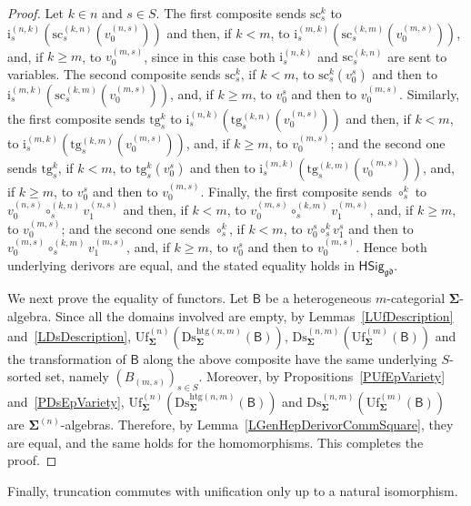 \documentclass[a4paper, reqno]{amsbook}
\newcommand{\sig}[1]{\mathbf{#1}}             %
\newcommand{\calg}[1]{\boldsymbol{\mathsf{#1}}} %
\newcommand{\gd}{\mathfrak{gd}}              %
\newcommand{\htg}{\mathrm{htg}}                %
\newcommand{\src}{\mathrm{sc}}
\newcommand{\tgt}{\mathrm{tg}}
\newcommand{\Uf}{\mathrm{Uf}}
\newcommand{\Ds}{\mathrm{Ds}}
\theoremstyle{plain}
\theoremstyle{definition}
\begin{document}
\begin{proof}
Let $k\in n$ and $s\in S$.
The first composite sends $\src^{k}_{s}$ to $\mathrm{i}^{(n,k)}_{s}(\src^{(k,n)}_{s}(v^{(n,s)}_{0}))$ and then, if $k<m$, to $\mathrm{i}^{(m,k)}_{s}(\src^{(k,m)}_{s}(v^{(m,s)}_{0}))$, and, if $k\geq m$, to $v^{(m,s)}_{0}$, since in this case both $\mathrm{i}^{(n,k)}_{s}$ and $\src^{(k,n)}_{s}$ are sent to variables.
The second composite sends $\src^{k}_{s}$, if $k<m$, to $\src^{k}_{s}(v^{s}_{0})$ and then to $\mathrm{i}^{(m,k)}_{s}(\src^{(k,m)}_{s}(v^{(m,s)}_{0}))$, and, if $k\geq m$, to $v^{s}_{0}$ and then to $v^{(m,s)}_{0}$.
Similarly, the first composite sends $\tgt^{k}_{s}$ to $\mathrm{i}^{(n,k)}_{s}(\tgt^{(k,n)}_{s}(v^{(n,s)}_{0}))$ and then, if $k<m$, to $\mathrm{i}^{(m,k)}_{s}(\tgt^{(k,m)}_{s}(v^{(m,s)}_{0}))$, and, if $k\geq m$, to $v^{(m,s)}_{0}$; and the second one sends $\tgt^{k}_{s}$, if $k<m$, to $\tgt^{k}_{s}(v^{s}_{0})$ and then to $\mathrm{i}^{(m,k)}_{s}(\tgt^{(k,m)}_{s}(v^{(m,s)}_{0}))$, and, if $k\geq m$, to $v^{s}_{0}$ and then to $v^{(m,s)}_{0}$.
Finally, the first composite sends $\circ^{k}_{s}$ to $v^{(n,s)}_{0}\circ^{(k,n)}_{s}v^{(n,s)}_{1}$ and then, if $k<m$, to $v^{(m,s)}_{0}\circ^{(k,m)}_{s}v^{(m,s)}_{1}$, and, if $k\geq m$, to $v^{(m,s)}_{0}$; and the second one sends $\circ^{k}_{s}$, if $k<m$, to $v^{s}_{0}\circ^{k}_{s}v^{s}_{1}$ and then to $v^{(m,s)}_{0}\circ^{(k,m)}_{s}v^{(m,s)}_{1}$, and, if $k\geq m$, to $v^{s}_{0}$ and then to $v^{(m,s)}_{0}$.
Hence both underlying derivors are equal, and the stated equality holds in $\mathsf{HSig}_{\gd}$.

We next prove the equality of functors.
Let $\calg{B}$ be a heterogeneous $m$-categorial $\sig{\Sigma}$-algebra.
Since all the domains involved are empty, by Lemmas~\ref{LUfDescription} and~\ref{LDsDescription}, $\Uf^{(n)}_{\sig{\Sigma}}(\Ds^{\htg(n,m)}_{\sig{\Sigma}}(\calg{B}))$, $\Ds^{(n,m)}_{\sig{\Sigma}}(\Uf^{(m)}_{\sig{\Sigma}}(\calg{B}))$ and the transformation of $\calg{B}$ along the above composite have the same underlying $S$-sorted set, namely $(B_{(m,s)})_{s\in S}$.
Moreover, by Propositions~\ref{PUfEpVariety} and~\ref{PDsEpVariety}, $\Uf^{(n)}_{\sig{\Sigma}}(\Ds^{\htg(n,m)}_{\sig{\Sigma}}(\calg{B}))$ and $\Ds^{(n,m)}_{\sig{\Sigma}}(\Uf^{(m)}_{\sig{\Sigma}}(\calg{B}))$ are $\sig{\Sigma}^{(n)}$-algebras.
Therefore, by Lemma~\ref{LGenHepDerivorCommSquare}, they are equal, and the same holds for the homomorphisms. This completes the proof.
\end{proof}

Finally, truncation commutes with unification only up to a natural isomorphism.
\end{document}
